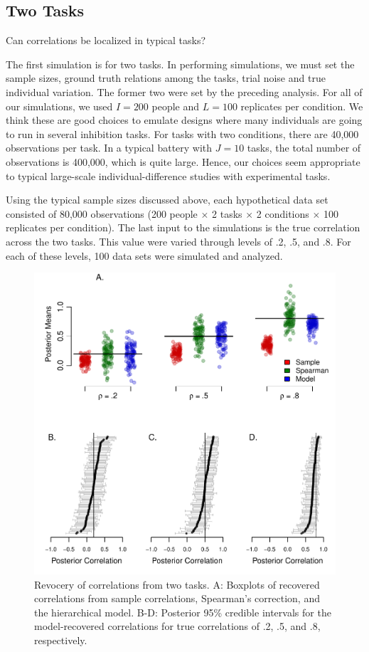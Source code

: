 \documentclass[
  ,man]{apa6}
\begin{document}
\hypertarget{two-tasks}{%
\subsection{Two Tasks}\label{two-tasks}}

Can correlations be localized in typical tasks?

The first simulation is for two tasks. In performing simulations, we must set the sample sizes, ground truth relations among the tasks, trial noise and true individual variation. The former two were set by the preceding analysis. For all of our simulations, we used \(I=200\) people and \(L=100\) replicates per condition. We think these are good choices to emulate designs where many individuals are going to run in several inhibition tasks. For tasks with two conditions, there are 40,000 observations per task. In a typical battery with \(J=10\) tasks, the total number of observations is 400,000, which is quite large. Hence, our choices seem appropriate to typical large-scale individual-difference studies with experimental tasks.

Using the typical sample sizes discussed above, each hypothetical data set consisted of 80,000 observations (200 people \(\times\) 2 tasks \(\times\) 2 conditions \(\times\) 100 replicates per condition). The last input to the simulations is the true correlation across the two tasks. This value were varied through levels of .2, .5, and .8. For each of these levels, 100 data sets were simulated and analyzed.

\begin{figure}
\centering
\includegraphics{p_files/figure-latex/recov2-1.pdf}
\caption{\label{fig:recov2}Revocery of correlations from two tasks. A: Boxplots of recovered correlations from sample correlations, Spearman's correction, and the hierarchical model. B-D: Posterior 95\% credible intervals for the model-recovered correlations for true correlations of .2, .5, and .8, respectively.}
\end{figure}
\end{document}
